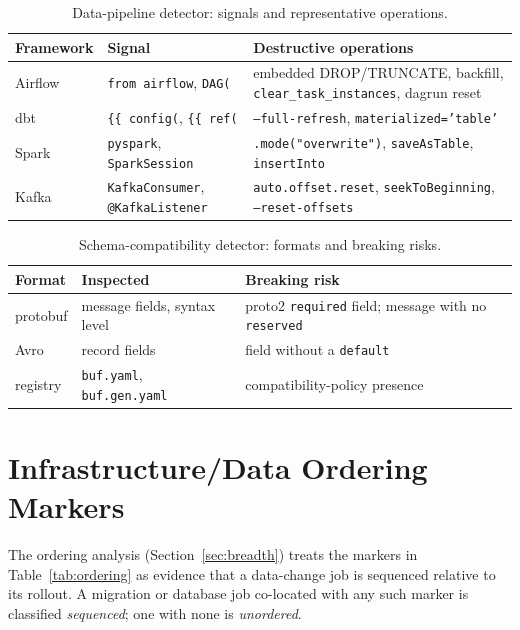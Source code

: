 \documentclass[11pt]{article}
\newcommand{\code}[1]{\texttt{#1}}
\begin{document}
\begin{table}[h]\centering\small
\caption{Data-pipeline detector: signals and representative operations.}
\label{tab:pipelinerules}
\begin{tabular}{>{\raggedright\arraybackslash}p{2.2cm}>{\raggedright\arraybackslash}p{4.6cm}>{\raggedright\arraybackslash}p{6.0cm}}
\toprule
\textbf{Framework} & \textbf{Signal} & \textbf{Destructive operations} \\
\midrule
Airflow & \code{from airflow}, \code{DAG(} & embedded DROP/TRUNCATE, backfill,
\code{clear\_task\_instances}, dagrun reset \\
dbt & \code{\{\{ config(}, \code{\{\{ ref(} & \code{--full-refresh}, \code{materialized='table'} \\
Spark & \code{pyspark}, \code{SparkSession} & \code{.mode("overwrite")}, \code{saveAsTable},
\code{insertInto} \\
Kafka & \code{KafkaConsumer}, \code{@KafkaListener} & \code{auto.offset.reset},
\code{seekToBeginning}, \code{--reset-offsets} \\
\bottomrule
\end{tabular}
\end{table}

\begin{table}[h]\centering\small
\caption{Schema-compatibility detector: formats and breaking risks.}
\label{tab:schemarules}
\begin{tabular}{>{\raggedright\arraybackslash}p{2.2cm}>{\raggedright\arraybackslash}p{4.6cm}>{\raggedright\arraybackslash}p{6.0cm}}
\toprule
\textbf{Format} & \textbf{Inspected} & \textbf{Breaking risk} \\
\midrule
protobuf & message fields, syntax level & proto2 \code{required} field; message with no
\code{reserved} \\
Avro & record fields & field without a \code{default} \\
registry & \code{buf.yaml}, \code{buf.gen.yaml} & compatibility-policy presence \\
\bottomrule
\end{tabular}
\end{table}

\section{Infrastructure/Data Ordering Markers}
\label{app:ordering}

The ordering analysis (Section~\ref{sec:breadth}) treats the markers in Table~\ref{tab:ordering} as
evidence that a data-change job is sequenced relative to its rollout. A migration or database job
co-located with any such marker is classified \emph{sequenced}; one with none is \emph{unordered}.
\end{document}

